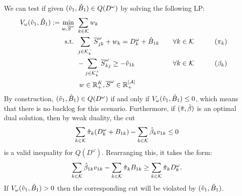 \documentclass[10pt]{article}
\newcommand{\ka}{k} %
\newcommand{\KA}{\mathcal{K}}
\newcommand{\Ka}{K}
\newcommand{\jey}{j} %
\newcommand{\Graf}{\mathcal{A}} %
\newcommand{\Bi}{B} %
\newcommand{\Vi}{v} %
\newcommand{\m}{\omega} %
\newcommand{\Csub}{\mathcal{K}^+_k}
\newcommand{\Psub}{\mathcal{K}^-_k}
\newcommand{\Sc}{\overline{S}}
\begin{document}
We can test if given $(\vsol_1,\bsol_1) \in Q(D^\m)$ by solving the following LP:
\begin{alignat}{3}
V_\m(\vsol_1,\bsol_1) :=  \min_{w,\Sc^\m} \ & \sum_{\ka  \in \KA} w_\ka \notag\\
    \text{s.t. } & \sum_{\jey \in  \Psub} \Sc^\m_{\jey \ka } + w_\ka = D^ {\m}_{\ka} + \bsol_{1\ka} \quad  &&\forall \ka  \in \KA && \qquad(\pi_\ka) \notag\\
    &-\sum_{\jey \in  \Csub} \Sc^\m_{\ka \jey} \geq -\vsol_{1\ka} \ && \forall \ka  \in \KA&& \qquad (\beta_\ka) \notag\\
    & \ w \in \mathbb{R}_+^{\Ka}, \Sc^\m \in \mathbb{R}_+^{|\Graf|} \notag
\end{alignat}
By construction, $(\vsol_1,\bsol_1) \in Q(D^\m)$ if and only if $V_\m(\vsol_1,\bsol_1) \leq 0$, which means that there is no backlog for this scenario. Furthermore, if $(\hat{\pi},\hat{\beta})$ is an optimal dual solution, then by weak duality, the cut
 \[ \sum_{\ka  \in \KA} \pisol_k (D^ {\m}_{\ka} + \Bi_{1\ka}) - \sum_{\ka  \in \KA} \betasol_\ka \Vi_{1\ka} \leq 0 \]
is a valid inequality for $Q(D^\m)$. Rearranging this, it takes the form:
\[ \sum_{\ka  \in \KA} \betasol_{1\ka} \Vi_{1\ka} - \sum_{\ka  \in \KA} \pisol_k \Bi_{1\ka}  \geq  \sum_{\ka  \in \KA} \pisol_k D^ {\m}_{\ka}. \]
If $V_\m(\vsol_1,\bsol_1) > 0$ then the corresponding cut will be violated by $(\vsol_1,\bsol_1)$. 
\end{document}
